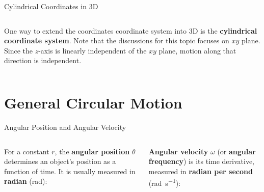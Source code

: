 \documentclass[12pt,compress,aspectratio=169]{beamer}
\begin{document}
\begin{frame}{Cylindrical Coordinates in 3D}
  \begin{columns}

    One way to extend the coordinates coordinate system into 3D is the
    \textbf{cylindrical coordinate system}. Note that the discussions for this
    topic focuses on $xy$ plane. Since the $z$-axis is linearly independent of
    the $xy$ plane, motion along that direction is independent.
  \end{columns}
\end{frame}



\section{General Circular Motion}

\begin{frame}{Angular Position and Angular Velocity}
  \vspace{.2in}
  \begin{columns}
    
    For a constant $r$, the \textbf{angular position} $\theta$ determines an
    object's position as a function of time. It is usually measured in
    \textbf{radian} (\si{\radian}):

    
    \textbf{Angular velocity} $\omega$ (or \textbf{angular frequency}) is its
    time derivative, measured in \textbf{radian per second}
    (\si{\radian\per\second}):
      
  \end{columns}
\end{frame}
\end{document}
